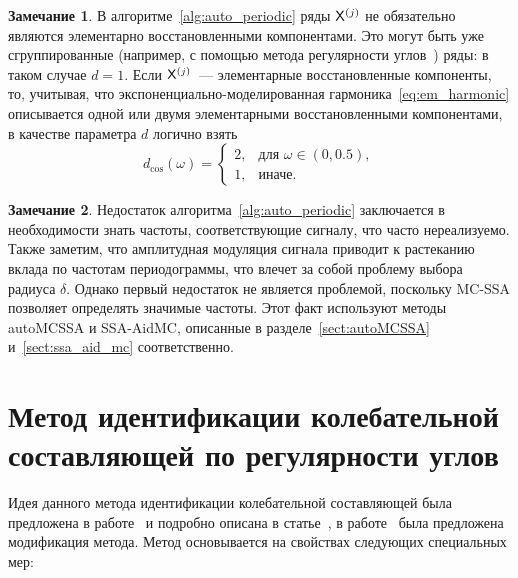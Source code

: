 \documentclass[specialist,
substylefile = spbu_report.rtx,
subf,12pt]{disser}
\theoremstyle{definition}
\newtheorem{remark}{Замечание}[chapter]
\begin{document}
\begin{remark}
	В алгоритме~\ref{alg:auto_periodic} ряды $\mathsf{X}^{(j)}$ не обязательно являются элементарно восстановленными компонентами. Это могут быть уже сгруппированные (например, с помощью метода регулярности углов~\cite{GolyandinaZhornikova2023}) ряды: в таком случае $d=1$. Если $\mathsf{X}^{(j)}$~--- элементарные восстановленные компоненты, то, учитывая, что экспоненциально-моделированная гармоника~\eqref{eq:em_harmonic} описывается одной или двумя элементарными восстановленными компонентами, в качестве параметра $d$ логично взять
	\begin{equation}\label{eq:d_cos}
		d_{\cos}(\omega)=
		\begin{cases}
			2, & \text{для } \omega\in(0, 0.5), \\
			1, & \text{иначе}.
		\end{cases}
	\end{equation}
\end{remark}

\begin{remark}
	Недостаток алгоритма~\ref{alg:auto_periodic} заключается в необходимости знать частоты, соответствующие сигналу, что часто нереализуемо. Также заметим, что амплитудная модуляция сигнала приводит к растеканию вклада по частотам периодограммы, что влечет за собой проблему выбора радиуса $\delta$. Однако первый недостаток не является проблемой, поскольку MC-SSA позволяет определять значимые частоты. Этот факт используют методы autoMCSSA и SSA-AidMC, описанные в разделе~\ref{sect:autoMCSSA} и~\ref{sect:ssa_aid_mc} соответственно.
\end{remark}

\section{Метод идентификации колебательной составляющей по регулярности углов}\label{sect:angle_reg}

Идея данного метода идентификации колебательной составляющей была предложена в работе~\cite{Zhornikova2018} и подробно описана в статье~\cite{GolyandinaZhornikova2023}, в работе~\cite{Dudnik2025} была предложена модификация метода. Метод основывается на свойствах следующих специальных мер:
\end{document}
